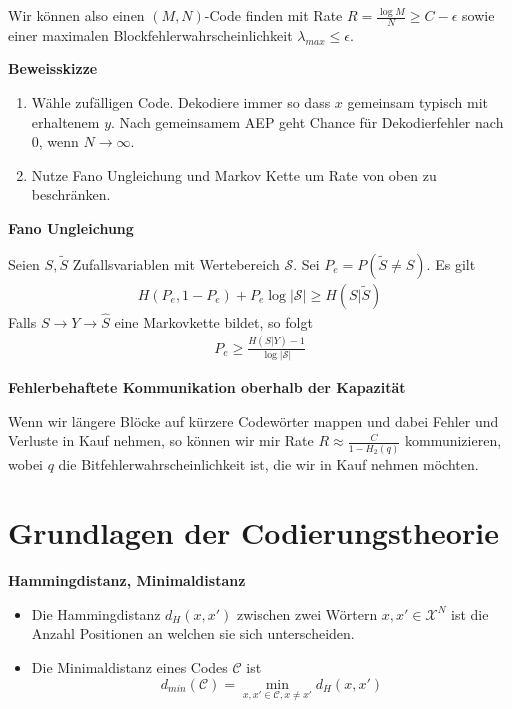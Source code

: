 \documentclass[25pt]{sciposter}
\renewcommand{\hat}{\widehat}
\newenvironment{defn}[1]{\begin{mdframed}[backgroundcolor=blue!10,innertopmargin=15pt, nobreak=true,innerbottommargin=15pt]
		\textbf{#1 }
	}
	{ 
	\end{mdframed}
}
\newenvironment{thm}[1]{\begin{mdframed}[nobreak=true,backgroundcolor=Emerald!10,innertopmargin=15pt, innerbottommargin=15pt]
		\textbf{#1 }
	}
	{ 
	\end{mdframed}
}
\begin{document}
\begin{multicols}{3}
Wir können also einen $(M,N)$-Code finden mit Rate $R = \frac{\log M }{N} \geq C-\epsilon$ sowie einer maximalen Blockfehlerwahrscheinlichkeit $\lambda_{max}\leq \epsilon$.

\textbf{Beweisskizze}
\begin{enumerate}
\item Wähle zufälligen Code. Dekodiere immer so dass $x$ gemeinsam typisch mit erhaltenem $y$. Nach gemeinsamem AEP geht Chance für Dekodierfehler nach 0, wenn $N \to \infty$.
\item Nutze Fano Ungleichung und Markov Kette um Rate von oben zu beschränken.
\end{enumerate}

\begin{thm}{Fano Ungleichung}
	Seien $S,\tilde{S}$ Zufallsvariablen mit Wertebereich $\mathcal{S}$. Sei $P_e = P(\tilde{S} \neq S)$. Es gilt
	\begin{align*}
		H(P_e,1-P_e) + P_e \log|\mathcal{S}| \geq H(S|\tilde{S})
	\end{align*}
	Falls $S\to Y \to \hat{S}$ eine Markovkette bildet, so folgt
	\begin{align*}
		P_e \geq \frac{H(S|Y) - 1}{\log |\mathcal{S}|}
	\end{align*}
\end{thm}



\textbf{Fehlerbehaftete Kommunikation oberhalb der Kapazität}

Wenn wir längere Blöcke auf kürzere Codewörter mappen und dabei Fehler und Verluste in Kauf nehmen, so können wir mir Rate $R\approx \frac{C}{1-H_2(q)}$ kommunizieren, wobei $q$ die Bitfehlerwahrscheinlichkeit ist, die wir in Kauf nehmen möchten.


\section{Grundlagen der Codierungstheorie}


\begin{defn}{Hammingdistanz, Minimaldistanz}
	\begin{itemize}
		\item Die Hammingdistanz $d_H(x,x')$ zwischen zwei Wörtern $x,x'\in\mathcal{X}^N$ ist die Anzahl Positionen an welchen sie sich unterscheiden.
		\item Die Minimaldistanz eines Codes $\mathcal{C}$ ist $$d_{min}(\mathcal{C}) =\min_{x,x'\in \mathcal{C}, x\neq x'} d_H(x,x')$$
	\end{itemize}
\end{defn}



\end{multicols}
\end{document}
